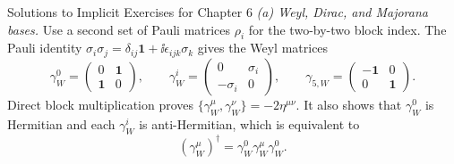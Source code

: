 \begin{bankssolutions}{Solutions to Implicit Exercises for Chapter 6}
\textit{(a) Weyl, Dirac, and Majorana bases.}
Use a second set of Pauli matrices \(\rho_i\) for the two-by-two block
index.  The Pauli identity
\(\sigma_i\sigma_j=\delta_{ij}\mathbf1+\ii\epsilon_{ijk}\sigma_k\)
gives the Weyl matrices
\begin{equation*}
 \gamma_W^0=\begin{pmatrix}0&\mathbf1\\ \mathbf1&0\end{pmatrix},
 \qquad
 \gamma_W^i=\begin{pmatrix}0&\sigma_i\\-\sigma_i&0\end{pmatrix},
 \qquad
 \gamma_{5,W}=\begin{pmatrix}-\mathbf1&0\\0&\mathbf1\end{pmatrix}.
\end{equation*}
Direct block multiplication proves
\(\{\gamma_W^\mu,\gamma_W^\nu\}=-2\eta^{\mu\nu}\).  It also shows that
\(\gamma_W^0\) is Hermitian and each \(\gamma_W^i\) is anti-Hermitian,
which is equivalent to
\begin{equation*}
 (\gamma_W^\mu)^\dagger=\gamma_W^0\gamma_W^\mu\gamma_W^0.
\end{equation*}


\end{bankssolutions}
